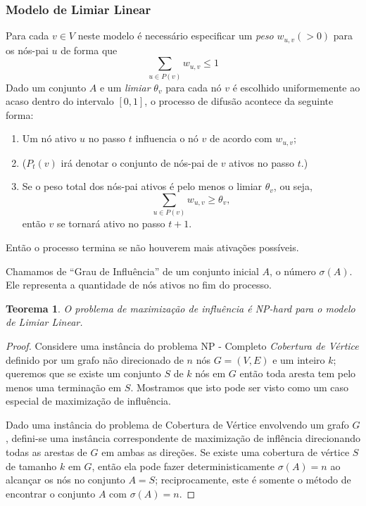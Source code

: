 \documentclass{acm_proc_article-sp}
\newtheorem{thm}{Teorema}
\begin{document}
  \subsubsection{Modelo de Limiar Linear}\label{ltm}
Para cada $v \in V$ neste modelo é necessário especificar um \textit{peso} $w_{u,v} (> 0)$ para os nós-pai $u$ de forma que 
\begin{equation} \label{1}
\sum_{u\in P(v)} w_{u,v} \leq 1 
\end{equation}
Dado um conjunto $A$ e um \textit{limiar} $\theta_{v}$ para cada nó $v$ é escolhido uniformemente ao acaso dentro do intervalo $[0,1]$,
o processo de difusão acontece da seguinte forma:
\begin{enumerate}
  \item Um nó ativo $u$ no passo $t$ influencia o nó $v$ de acordo com $w_{u,v}$;
  \item ($P_{t}(v)$ irá denotar o conjunto de nós-pai de $v$ ativos no passo $t$.)
  \item Se o peso total dos nós-pai ativos é pelo menos o limiar $\theta_{v}$, ou seja, $$\sum_{u\in P(v)} w_{u,v}
  \geq \theta_{v},$$ então $v$ se tornará ativo no passo $t+1$.
\end{enumerate}
Então o processo termina se não houverem mais ativações possíveis.

Chamamos de ``Grau de Influência'' de um conjunto inicial $A$, o número $\sigma(A)$. Ele representa a quantidade de nós 
ativos no fim do processo.

\begin{thm}
O problema de maximização de influência é NP-hard para o modelo de Limiar Linear.
\end{thm}

\begin{proof}
Considere uma instância do problema NP - Completo \textit{Cobertura de Vértice} definido por um grafo não
direcionado de $n$ nós $G = (V,E)$ e um inteiro $k$; queremos que se existe um conjunto $S$ de $k$ nós em $G$ então
toda aresta tem pelo menos uma terminação em $S$. Mostramos que isto pode ser visto como um caso especial de
maximização de influência.

Dado uma instância do problema de Cobertura de Vértice envolvendo um grafo $G$, defini-se uma instância
correspondente de maximização de inflência direcionando todas as arestas de $G$ em ambas as direções. Se existe uma
cobertura de vértice $S$ de tamanho $k$ em $G$, então ela pode fazer deterministicamente $\sigma(A) = n$ ao
alcançar os nós no conjunto $A = S$; reciprocamente, este é somente o método de encontrar o conjunto $A$ com
$\sigma(A) = n$.

\end{proof}
\end{document}
